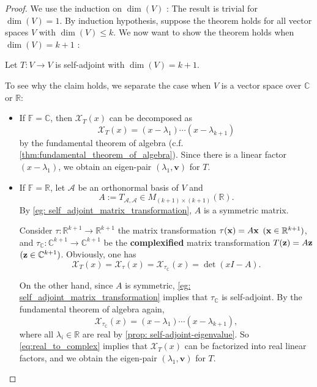 \begin{proof}
We use the induction on \(\dim \left( V\right)\) : The result is trivial for \(\dim \left( V\right)  = 1\). By induction hypothesis, suppose the theorem holds for all vector spaces \(V\) with \(\dim \left( V\right)  \leq  k\). We now want to show the theorem holds when \(\dim \left( V\right)  = k + 1\) :

Let \(T : V \rightarrow  V\) is self-adjoint with \(\dim \left( V\right)  = k + 1\). 

\begin{center}
\end{center}
To see why the claim holds, we separate the case when $V$ is a vector space over $\mathbb{C}$ or $\mathbb{R}$:
\begin{itemize}
\item If \(\mathbb{F} = \mathbb{C}\), then \({\mathcal{X}}_{T}\left( x\right)\) can be decomposed as
\[
{\mathcal{X}}_{T}\left( x\right)  = \left( {x - {\lambda }_{1}}\right) \cdots \left( {x - {\lambda }_{k + 1}}\right)
\]
by the fundamental theorem of algebra (c.f. \autoref{thm:fundamental_theorem_of_algebra}). Since there is a linear factor $\left( {x - {\lambda }_{1}}\right)$, we obtain an eigen-pair \(\left( {{\lambda }_{1},\mathbf{v}}\right)\) for $T$.

\item If \(\mathbb{F} = \mathbb{R}\), let $\mathcal{A}$ be an orthonormal basis of $V$ and
$$A := T_{\mathcal{A},\mathcal{A}} \in M_{(k+1) \times (k+1)}(\mathbb{R}).$$
By \autoref{eg: self_adjoint_matrix_transformation}, $A$ is a symmetric matrix.

\smallskip
Consider $\tau: \mathbb{R}^{k+1} \to \mathbb{R}^{k+1}$ the matrix transformation $\tau({\bf x}) = A{\bf x}$ $({\bf x} \in \mathbb{R}^{k+1})$, and 
$\tau_{\mathbb{C}}: \mathbb{C}^{k+1} \to \mathbb{C}^{k+1}$ be the {\bf complexified} matrix transformation $T({\bf z}) = A{\bf z}$ $({\bf z} \in \mathbb{C}^{k+1})$. Obviously, one has
\begin{equation} \label{eq:real_to_complex}
\mathcal{X}_T(x) = \mathcal{X}_{\tau}(x) = \mathcal{X}_{\tau_{\mathbb{C}}}(x) = \det(xI-A).
\end{equation}

On the other hand, since $A$ is symmetric, \autoref{eg: self_adjoint_matrix_transformation} implies that $\tau_{\mathbb{C}}$ is self-adjoint. By the fundamental theorem of algebra again, 
\[
{\mathcal{X}}_{\tau_{\mathbb{C}}}\left( x\right)  = \left( {x - {\lambda }_{1}}\right) \cdots \left( {x - {\lambda }_{k + 1}}\right),
\]
where all \({\lambda }_{i}\in \mathbb{R}\) are real by \autoref{prop: self-adjoint-eigenvalue}. So \autoref{eq:real_to_complex} implies that $\mathcal{X}_T(x)$ can be factorized into real linear factors, and we obtain the eigen-pair \(\left( {{\lambda }_{1},\mathbf{v}}\right)\) for $T$.
\end{itemize}


\end{proof}
